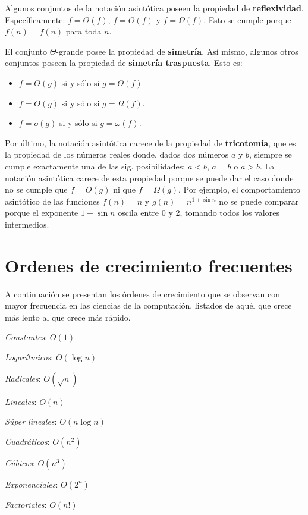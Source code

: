 Algunos conjuntos de la notación asintótica poseen la propiedad de \textbf{reflexividad}. 
Específicamente: \(f=\Theta(f)\), \(f=O(f)\) y \(f=\Omega(f)\). 
Esto se cumple porque \(f(n)=f(n)\) para toda \(n\).

El conjunto $\Theta$-grande posee la propiedad de \textbf{simetría}.
Así mismo, algunos otros conjuntos poseen la propiedad de \textbf{simetría traspuesta}.
Esto es:
\begin{itemize}
  \item \(f=\Theta(g)\) si y sólo si \(g=\Theta(f)\)
  \item \(f=O(g)\) si y sólo si \(g=\Omega(f)\).
  \item \(f=o(g)\) si y sólo si \(g=\omega(f)\).
\end{itemize}


Por último, la notación asintótica carece de la propiedad de \textbf{tricotomía}, que es la propiedad de los números reales donde, dados dos números $a$ y $b$, siempre se cumple exactamente una de las sig. posibilidades: $a<b$, $a=b$ o $a>b$. 
La notación asintótica carece de esta propiedad porque se puede dar el caso donde no se cumple que \(f=O(g)\) ni que \(f=\Omega(g)\).
Por ejemplo, el comportamiento asintótico de las funciones \(f(n)=n\) y \(g(n)=n^{1+\sin{n}}\) no se puede comparar porque el exponente $1+\sin{n}$ oscila entre 0 y 2, tomando todos los valores intermedios.

\section{Ordenes de crecimiento frecuentes}

A continuación se presentan los órdenes de crecimiento que se observan con mayor frecuencia en las ciencias de la computación, listados de aquél que crece más lento al que crece más rápido.

\begin{enumerate}
  \begin{multicols}{2}
    \item \emph{Constantes}: \(O(1)\)
    \item \emph{Logarítmicos}: \(O(\log n)\)
    \item \emph{Radicales}: \(O(\sqrt{n})\)
    \item \emph{Lineales}: \(O(n)\)
    \item \emph{Súper lineales}: \(O(n\log n)\)
    \item \emph{Cuadráticos}: \(O(n^{2})\)
    \item \emph{Cúbicos}: \(O(n^{3})\)
    \item \emph{Exponenciales}: \(O(2^{n})\)
    \item \emph{Factoriales}: \(O(n!)\)
  \end{multicols}
\end{enumerate}

